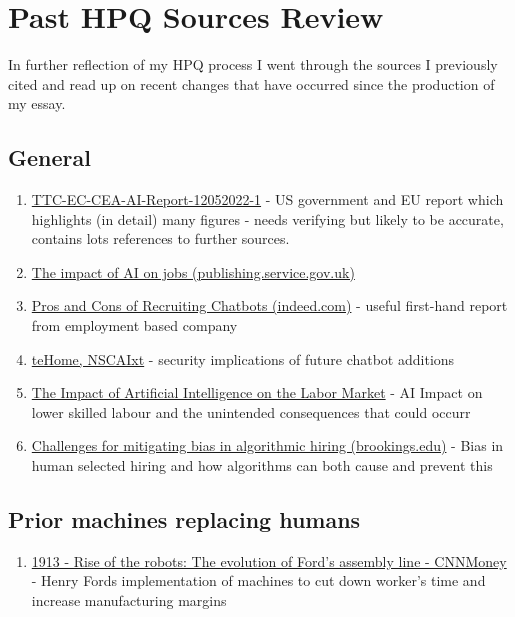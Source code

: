 \section{Past HPQ Sources Review}
\label{research:ReviewSources}
In further reflection of my HPQ process I went through the sources I previously cited and read up on recent changes that have occurred since the production of my essay.

\subsection{General}
\begin{enumerate}


    \item \href{https://www.whitehouse.gov/wp-content/uploads/2022/12/TTC-EC-CEA-AI-Report-12052022-1.pdf}{TTC-EC-CEA-AI-Report-12052022-1} - US government and EU report which highlights (in detail) many figures - needs verifying but likely to be accurate, contains lots references to further sources.

    \item \href{https://assets.publishing.service.gov.uk/government/uploads/system/uploads/attachment_data/file/1023590/impact-of-ai-on-jobs.pdf}{The impact of AI on jobs (publishing.service.gov.uk)}

    \item \href{https://www.indeed.com/hire/c/info/pros-and-cons-of-recruiting-chatbots#3}{Pros and Cons of Recruiting Chatbots (indeed.com)} - useful first-hand report from employment based company

    \item \href{https://www.nscai.gov/}{teHome, NSCAIxt} - security implications of future chatbot additions


    \item \href{https://www.michaelwebb.co/webb_ai.pdf}{The Impact of Artificial Intelligence on the Labor Market} - AI Impact on lower skilled labour and the unintended consequences that could occurr

    \item \href{https://www.brookings.edu/research/challenges-for-mitigating-bias-in-algorithmic-hiring/}{Challenges for mitigating bias in algorithmic hiring (brookings.edu)} - Bias in human selected hiring and how algorithms can both cause and prevent this
\end{enumerate}

\subsection{Prior machines replacing humans}
\begin{enumerate}
    \item \href{https://money.cnn.com/gallery/technology/2015/04/29/ford-factory-assembly-line-robots/index.html}{1913 - Rise of the robots: The evolution of Ford's assembly line - CNNMoney} - Henry Fords implementation of machines to cut down worker’s time and increase manufacturing margins
\end{enumerate}
